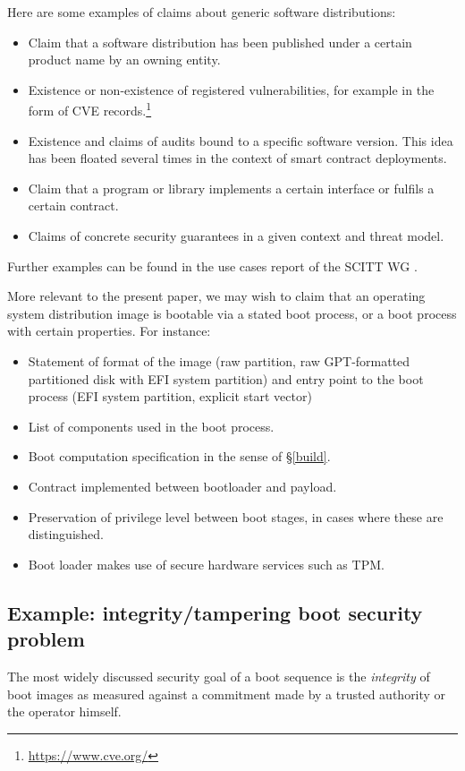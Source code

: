 Here are some examples of claims about generic software distributions:
\begin{itemize}
  \item Claim that a software distribution has been published under a certain product name by an owning entity.
  \item Existence or non-existence of registered vulnerabilities, for example in the form of CVE records.\footnote{\url{https://www.cve.org/}}
  \item Existence and claims of audits bound to a specific software version. This idea has been floated several times in the context of smart contract deployments.
  \item Claim that a program or library implements a certain interface or fulfils a certain contract.
  \item Claims of concrete security guarantees in a given context and threat model.
\end{itemize}
%
Further examples can be found in the use cases report of the SCITT WG \cite{ietf-scitt-software-use-cases-02}.

More relevant to the present paper, we may wish to claim that an operating system distribution image is bootable via a stated boot process, or a boot process with certain properties.
%
For instance:
\begin{itemize}
  \item Statement of format of the image (raw partition, raw GPT-formatted partitioned disk with EFI system partition) and entry point to the boot process (EFI system partition, explicit start vector)
  \item List of components used in the boot process.
  \item Boot computation specification in the sense of \S\ref{build}.
  \item Contract implemented between bootloader and payload.
  \item Preservation of privilege level between boot stages, in cases where these are distinguished.
  \item Boot loader makes use of secure hardware services such as TPM.
\end{itemize}
%


\subsection{Example: integrity/tampering boot security problem}

The most widely discussed security goal of a boot sequence is the \emph{integrity} of boot images as measured against a commitment made by a trusted authority or the operator himself.


